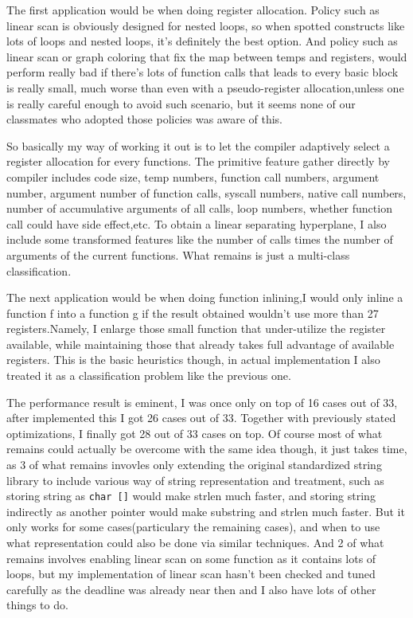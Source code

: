 \documentclass[a4paper]{article}
\begin{document}
The first application would be when doing register allocation. Policy such as linear scan
is obviously designed for nested loops, so when spotted constructs like lots of loops and
nested loops, it's definitely the best option. And policy such as linear scan or graph
coloring that fix the map between temps and registers, would perform really bad if there's
lots of function calls that leads to every basic block is really small, much worse than 
even with a pseudo-register allocation,unless one is really careful enough to avoid such scenario, 
but it seems none of our classmates who adopted those policies was aware of this.

So basically my way of working it out is to let the compiler adaptively select a register allocation
for every functions. The primitive feature gather directly by compiler includes code size, temp numbers,
function call numbers, argument number, argument number of function calls, syscall numbers, native call numbers,
number of accumulative arguments of all calls, loop numbers, whether function call could have side effect,etc.
To obtain a linear separating hyperplane, I also include some transformed features like the number of calls
times the number of arguments of the current functions.
What remains is just a multi-class classification.

The next application would be when doing function inlining,I would only inline a function f into a function g
if the result obtained wouldn't use more than 27 registers.Namely, I enlarge those small function that
under-utilize the register available, while maintaining those that already takes full advantage of available registers.
This is the basic heuristics though, in actual implementation I also treated it as a classification problem like the previous one.

The performance result is eminent, I was once only on top of 16 cases out of 33, after implemented this I got 26 cases out of 33.
Together with previously stated optimizations, I finally got 28 out of 33 cases on top.
Of course most of what remains could actually be overcome with the same idea though, it just takes time, as 3 of what remains invovles only extending
the original standardized string library to include various way of string representation and treatment, such as storing string as \verb|char []|
would make strlen much faster, and storing string indirectly as another pointer would make substring and strlen much faster.
But it only works for some cases(particulary the remaining cases), and when to use what representation could also be done via similar techniques.
And 2 of what remains involves enabling linear scan on some function as it contains lots of loops, but my implementation of linear scan 
hasn't been checked and tuned carefully as the deadline was already near then and I also have lots of other things to do.
\end{document}

